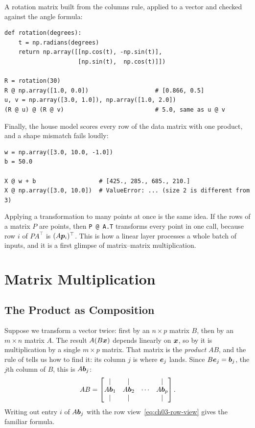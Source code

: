A rotation matrix built from the columns rule, applied to a vector and
checked against the angle formula:

\begin{lstlisting}
def rotation(degrees):
    t = np.radians(degrees)
    return np.array([[np.cos(t), -np.sin(t)],
                     [np.sin(t),  np.cos(t)]])

R = rotation(30)
R @ np.array([1.0, 0.0])                   # [0.866, 0.5]
u, v = np.array([3.0, 1.0]), np.array([1.0, 2.0])
(R @ u) @ (R @ v)                          # 5.0, same as u @ v
\end{lstlisting}

Finally, the house model scores every row of the data matrix with one
product, and a shape mismatch fails loudly:

\begin{lstlisting}
w = np.array([3.0, 10.0, -1.0])
b = 50.0

X @ w + b                  # [425., 285., 685., 210.]
X @ np.array([3.0, 10.0])  # ValueError: ... (size 2 is different from 3)
\end{lstlisting}

Applying a transformation to many points at once is the same idea. If the
rows of a matrix $P$ are points, then \texttt{P @ A.T} transforms every
point in one call, because row $i$ of $P A^\top$ is
$(A \bm{p}_i)^\top$. This is how a linear layer processes a whole batch
of inputs, and it is a first glimpse of matrix--matrix multiplication.

\section{Matrix Multiplication}
\label{sec:ch03-matmul}

\subsection{The Product as Composition}
\label{sec:ch03-composition}

Suppose we transform a vector twice: first by an $n \times p$ matrix $B$,
then by an $m \times n$ matrix $A$. The result $A(B\bm{x})$ depends
linearly on $\bm{x}$, so by  it is
multiplication by a single $m \times p$ matrix. That matrix is the
\emph{product} $AB$, and the rule of  tells us
how to find it: its column $j$ is where $\bm{e}_j$ lands. Since
$B\bm{e}_j = \bm{b}_j$, the $j$th column of $B$, this is
$A\bm{b}_j$:
\begin{equation}
  AB =
  \begin{bmatrix}
    | & | & & | \\
    A\bm{b}_1 & A\bm{b}_2 & \cdots & A\bm{b}_p \\
    | & | & & |
  \end{bmatrix}.
  \label{eq:ch03-matmul-cols}
\end{equation}
Writing out entry $i$ of $A\bm{b}_j$ with the row
view~\eqref{eq:ch03-row-view} gives the familiar formula.

